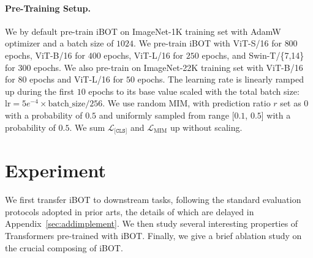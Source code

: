 \documentclass{article} %
\def\ourmethod{{iBOT}\xspace}
\begin{document}
\paragraph{Pre-Training Setup.} 
We by default pre-train \ourmethod on ImageNet-1K \citep{imagenet} training set with AdamW \citep{adamw} optimizer and a batch size of $1024$. We pre-train \ourmethod with ViT-S/16 for $800$ epochs, ViT-B/16 for $400$ epochs, ViT-L/16 for $250$ epochs, and Swin-T/\{7,14\} for $300$ epochs.
We also pre-train on ImageNet-22K training set with ViT-B/16 for $80$ epochs and ViT-L/16 for $50$ epochs.
The learning rate is linearly ramped up during the first $10$ epochs to its base value scaled with the total batch size: $\mathrm{lr} = 5e^{-4} \times \mathrm{batch\_size} / 256$.
We use random MIM, with prediction ratio $r$ set as $0$ with a probability of $0.5$ and uniformly sampled from range [$0.1$, $0.5$] with a probability of $0.5$.
We sum $\mathcal{L}_\texttt{[CLS]}$ and $\mathcal{L}_\mathrm{MIM}$ up without scaling.


\section{Experiment}
\label{sec:exp}

We first transfer \ourmethod to downstream tasks, following the standard evaluation protocols adopted in prior arts, %
the details of which are delayed in Appendix~\ref{sec:addimplement}.
We then study several interesting properties of Transformers pre-trained with \ourmethod. 
Finally, we give a brief ablation study on the crucial composing of \ourmethod.
\end{document}
